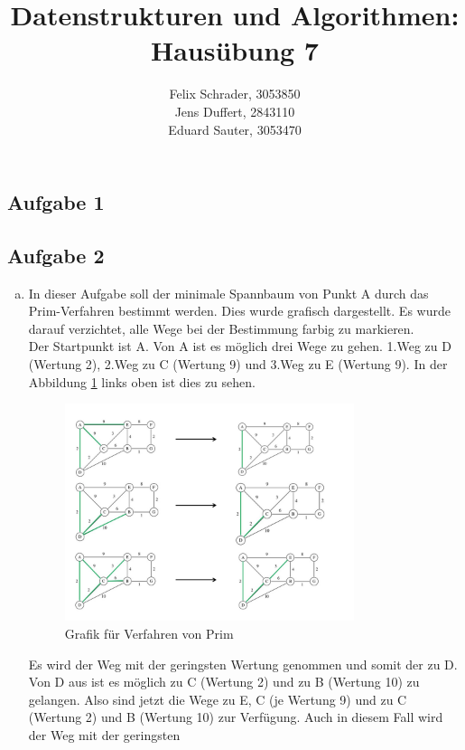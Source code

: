 \documentclass[11pt]{article}
\author{
  Felix Schrader, 3053850 \\ 
  Jens Duffert, 2843110 \\
  Eduard Sauter, 3053470
}
\title{Datenstrukturen und Algorithmen: Haus\"ubung 7}
\begin{document}
\maketitle


\subsection*{Aufgabe 1}
  


  \newpage
  
  
  
\subsection*{Aufgabe 2}
\begin{enumerate}[a)]
	\item
	In dieser Aufgabe soll der minimale Spannbaum von Punkt A durch das
	Prim-Verfahren bestimmt werden. Dies wurde grafisch dargestellt. Es wurde
	darauf verzichtet, alle Wege bei der Bestimmung farbig zu markieren.\\
	Der Startpunkt ist A. Von A ist es möglich drei Wege zu gehen.
	1.Weg zu D (Wertung 2), 2.Weg zu C (Wertung 9) und 3.Weg zu E (Wertung 9).
	In der Abbildung \ref{fig:a1} links oben ist dies zu sehen.
	\begin{figure}[h!]
		\centering
		\includegraphics[width=0.8\textwidth]{aufgabe2ateil1.png}
		\caption{Grafik für Verfahren von Prim}
		\label{fig:a1}
	\end{figure}
	Es wird der Weg mit der geringsten Wertung genommen und somit der zu D.
	Von D aus ist es möglich zu C (Wertung 2) und zu B (Wertung 10) zu gelangen.
	Also sind jetzt die Wege zu E, C (je Wertung 9) und zu C (Wertung 2) und B
	(Wertung 10) zur Verfügung. Auch in diesem Fall wird der Weg mit der geringsten

\end{enumerate}
\end{document}
